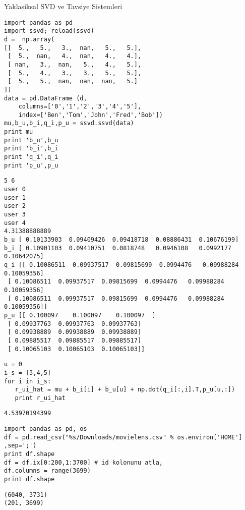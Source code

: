 \documentclass[12pt,fleqn]{article}\usepackage{../common}
\begin{document}
Yaklasiksal SVD ve Tavsiye Sistemleri

\begin{verbatim}
import pandas as pd
import ssvd; reload(ssvd)
d =  np.array(
[[  5.,   5.,   3.,  nan,   5.,   5.],
 [  5.,  nan,   4.,  nan,   4.,   4.],
 [ nan,   3.,  nan,   5.,   4.,   5.],
 [  5.,   4.,   3.,   3.,   5.,   5.],
 [  5.,   5.,  nan,  nan,  nan,   5.]
])
data = pd.DataFrame (d,
    columns=['0','1','2','3','4','5'],
    index=['Ben','Tom','John','Fred','Bob'])
mu,b_u,b_i,q_i,p_u = ssvd.ssvd(data)
print mu
print 'b_u',b_u
print 'b_i',b_i
print 'q_i',q_i
print 'p_u',p_u
\end{verbatim}

\begin{verbatim}
5 6
user 0
user 1
user 2
user 3
user 4
4.31388888889
b_u [ 0.10133903  0.09409426  0.09418718  0.08886431  0.10676199]
b_i [ 0.10901103  0.09410751  0.0818748   0.0946108   0.0992177   0.10642075]
q_i [[ 0.10086511  0.09937517  0.09815699  0.0994476   0.09988284  0.10059356]
 [ 0.10086511  0.09937517  0.09815699  0.0994476   0.09988284  0.10059356]
 [ 0.10086511  0.09937517  0.09815699  0.0994476   0.09988284  0.10059356]]
p_u [[ 0.100097    0.100097    0.100097  ]
 [ 0.09937763  0.09937763  0.09937763]
 [ 0.09938889  0.09938889  0.09938889]
 [ 0.09885517  0.09885517  0.09885517]
 [ 0.10065103  0.10065103  0.10065103]]
\end{verbatim}


\begin{verbatim}
u = 0
i_s = [3,4,5]
for i in i_s:
   r_ui_hat = mu + b_i[i] + b_u[u] + np.dot(q_i[:,i].T,p_u[u,:])
   print r_ui_hat
\end{verbatim}

\begin{verbatim}
4.53970194399
\end{verbatim}






\begin{verbatim}
import pandas as pd, os
df = pd.read_csv("%s/Downloads/movielens.csv" % os.environ['HOME'] ,sep=';')
print df.shape
df = df.ix[0:200,1:3700] # id kolonunu atla,
df.columns = range(3699)
print df.shape
\end{verbatim}

\begin{verbatim}
(6040, 3731)
(201, 3699)
\end{verbatim}
\end{document}
